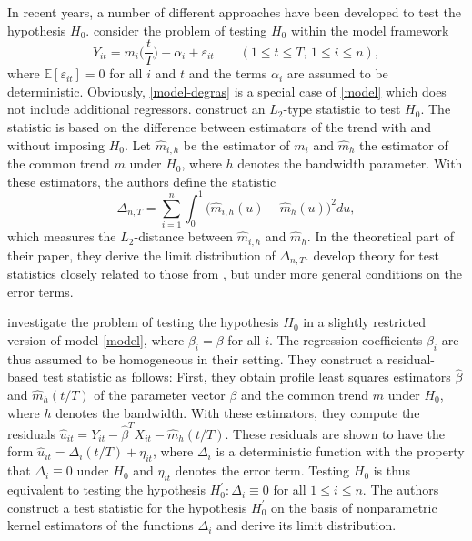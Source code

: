 \documentclass[a4paper,12pt]{article}
\begin{document}
In recent years, a number of different approaches have been developed to test the hypothesis $H_0$. \cite{DegrasWu2012} consider the problem of testing $H_0$ within the model framework
\begin{equation}\label{model-degras}
Y_{it} = m_i \Big( \frac{t}{T} \Big) + \alpha_i + \varepsilon_{it} \qquad (1 \le t \le T, \, 1 \le i \le n), 
\end{equation}
where $\mathbb{E}[\varepsilon_{it}] = 0$ for all $i$ and $t$ and the terms $\alpha_i$ are assumed to be deterministic. Obviously, \eqref{model-degras} is a special case of \eqref{model} which does not include additional regressors. \cite{DegrasWu2012} construct an $L_2$-type statistic to test $H_0$. The statistic is based on the difference between estimators of the trend with and without imposing $H_0$. Let $\hat{m}_{i,h}$ be the estimator of $m_i$ and $\hat{m}_h$ the estimator of the common trend $m$ under $H_0$, where $h$ denotes the bandwidth parameter. With these estimators, the authors define the statistic
\begin{equation}\label{stat-degras}
\Delta_{n,T} = \sum_{i=1}^n \int_0^1 \big(\hat{m}_{i,h}(u) - \hat{m}_h(u)\big)^2 du, 
\end{equation} 
which measures the $L_2$-distance between $\hat{m}_{i, h}$ and $\hat{m}_h$. In the theoretical part of their paper, they derive the limit distribution of $\Delta_{n,T}$. \cite{ChenWu2018} develop theory for test statistics closely related to those from \cite{DegrasWu2012}, but under more general conditions on the error terms. 


\cite{Zhang2012} investigate the problem of testing the hypothesis $H_0$ in a slightly restricted version of model \eqref{model}, where $\beta_i = \beta$ for all $i$. The regression coefficients $\beta_i$ are thus assumed to be homogeneous in their setting. They construct a residual-based test statistic as follows: First, they obtain profile least squares estimators $\hat{\beta}$ and $\hat{m}_h(t/T)$ of the parameter vector $\beta$ and the common trend $m$ under $H_0$, where $h$ denotes the bandwidth. With these estimators, they compute the residuals $\hat{u}_{it} = Y_{it} - \hat{\beta}^T X_{it} - \hat{m}_h(t/T)$. These residuals are shown to have the form $\hat{u}_{it} = \Delta_i(t/T) + \eta_{it}$, where $\Delta_i$ is a deterministic function with the property that $\Delta_i \equiv 0$ under $H_0$ and $\eta_{it}$ denotes the error term. Testing $H_0$ is thus equivalent to testing the hypothesis $H_0^\prime: \Delta_i \equiv 0$ for all $1 \le i \le n$. The authors construct a test statistic for the hypothesis $H_0^\prime$ on the basis of nonparametric kernel estimators of the functions $\Delta_i$ and derive its limit distribution.  
\end{document}
